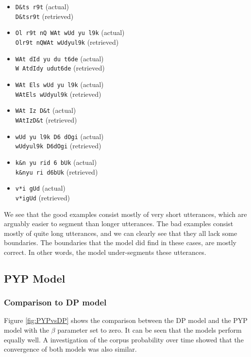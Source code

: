 \begin{multicols}{2}
\begin{itemize}
\item \texttt{D\&ts r9t} (actual)\\ \texttt{D\&tsr9t} (retrieved)
\item \texttt{Ol r9t nQ WAt wUd yu l9k} (actual)\\ \texttt{Olr9t nQWAt wUdyul9k} (retrieved)
\item \texttt{WAt dId yu du t6de} (actual)\\ \texttt{W AtdIdy udut6de} (retrieved)
\item \texttt{WAt Els wUd yu l9k} (actual)\\ \texttt{WAtEls wUdyul9k} (retrieved)
\item \texttt{WAt Iz D\&t} (actual)\\ \texttt{WAtIzD\&t} (retrieved)
\item \texttt{wUd yu l9k D6 dOgi} (actual)\\ \texttt{wUdyul9k D6dOgi} (retrieved)
\item \texttt{k\&n yu rid 6 bUk} (actual)\\ \texttt{k\&nyu ri d6bUk} (retrieved)
\item \texttt{v*i gUd} (actual)\\ \texttt{v*igUd} (retrieved)
\end{itemize}

\end{multicols}

We see that the good examples consist mostly of very short utterances, which are arguably easier to segment than longer utterances. The bad examples consist mostly of quite long utterances, and we can clearly see that they all lack some boundaries. The boundaries that the model did find in these cases, are mostly correct. In other words, the model under-segments these utterances.

\subsection{PYP Model}

\subsubsection{Comparison to DP model}
Figure \ref{fig:PYPvsDP} shows the comparison between the DP model and the PYP model with the $\beta$ parameter set to zero. It can be seen that the models perform equally well. A investigation of the corpus probability over time showed that the convergence of both models was also similar.

